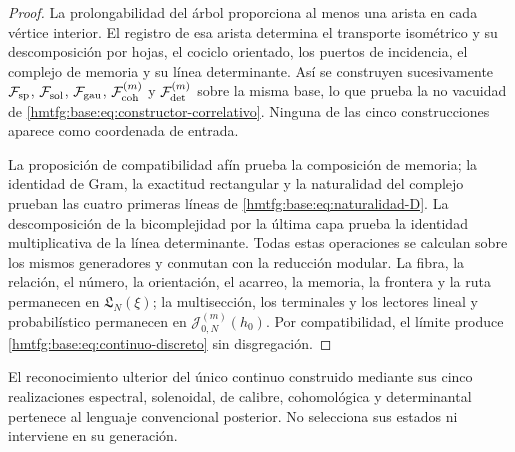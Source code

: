\begin{proof}
La prolongabilidad del árbol proporciona al menos una arista en cada vértice
interior. El registro de esa arista determina el transporte isométrico y su
descomposición por hojas, el cociclo orientado, los puertos de incidencia, el
complejo de memoria y su línea determinante. Así se construyen sucesivamente
\(\mathcal F_{\rm sp}\), \(\mathcal F_{\rm sol}\),
\(\mathcal F_{\rm gau}\), \(\mathcal F_{\rm coh}^{(m)}\) y
\(\mathcal F_{\rm det}^{(m)}\) sobre la misma base, lo que prueba la no
vacuidad de \eqref{hmtfg:base:eq:constructor-correlativo}. Ninguna de las cinco
construcciones aparece como coordenada de entrada.

La proposición de compatibilidad afín prueba la composición de memoria; la
identidad de Gram, la exactitud rectangular y la naturalidad del complejo
prueban las cuatro primeras líneas de \eqref{hmtfg:base:eq:naturalidad-D}. La
descomposición de la bicomplejidad por la última capa prueba la identidad
multiplicativa de la línea determinante. Todas estas operaciones se calculan
sobre los mismos generadores y conmutan con la reducción modular. La fibra,
la relación, el número, la orientación, el acarreo, la memoria, la frontera y
la ruta permanecen en \(\mathfrak L_N(\xi)\); la multisección, los terminales
y los lectores lineal y probabilístico permanecen en
\(\mathcal J_{0,N}^{(m)}(h_0)\). Por compatibilidad, el límite produce
\eqref{hmtfg:base:eq:continuo-discreto} sin disgregación.
\end{proof}

El reconocimiento ulterior del único continuo construido mediante sus cinco
realizaciones espectral, solenoidal, de calibre, cohomológica y determinantal
pertenece al lenguaje convencional posterior. No selecciona sus estados ni
interviene en su generación.
\fi


